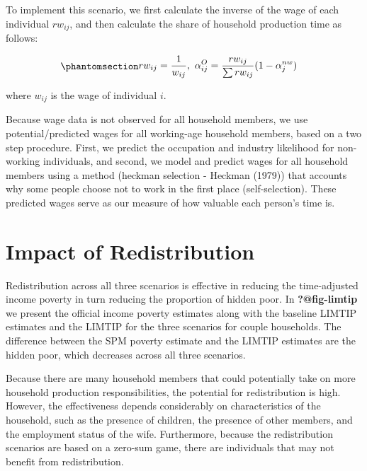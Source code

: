 \documentclass[
  11pt,
]{article}
\begin{document}
To implement this scenario, we first calculate the inverse of the wage
of each individual \(rw_{ij}\), and then calculate the share of
household production time as follows:

\begin{equation}\phantomsection\label{eq-r3}{\begin{aligned}
rw_{ij} &= \frac{1}{w_{ij}}, \ \alpha_{ij}^O  = \frac{rw_{ij}}{\sum rw_{ij}} (1-\alpha_{j}^{nw})
\end{aligned}
}\end{equation}

where \(w_{ij}\) is the wage of individual \(i\).

Because wage data is not observed for all household members, we use
potential/predicted wages for all working-age household members, based
on a two step procedure. First, we predict the occupation and industry
likelihood for non-working individuals, and second, we model and predict
wages for all household members using a method (heckman selection -
Heckman (1979)) that accounts why some people choose not to work in the
first place (self-selection). These predicted wages serve as our measure
of how valuable each person's time is.

\section{Impact of Redistribution}\label{impact-of-redistribution}

Redistribution across all three scenarios is effective in reducing the
time-adjusted income poverty in turn reducing the proportion of hidden
poor. In \textbf{?@fig-limtip} we present the official income poverty
estimates along with the baseline LIMTIP estimates and the LIMTIP for
the three scenarios for couple households. The difference between the
SPM poverty estimate and the LIMTIP estimates are the hidden poor, which
decreases across all three scenarios.

Because there are many household members that could potentially take on
more household production responsibilities, the potential for
redistribution is high. However, the effectiveness depends considerably
on characteristics of the household, such as the presence of children,
the presence of other members, and the employment status of the wife.
Furthermore, because the redistribution scenarios are based on a
zero-sum game, there are individuals that may not benefit from
redistribution.
\end{document}
